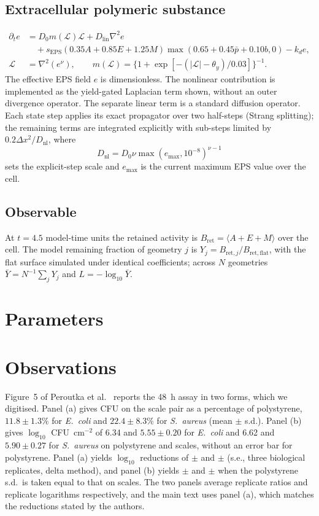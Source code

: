 \documentclass[11pt]{article}
\newcommand{\Ec}{\textit{E.~coli}}
\newcommand{\Sa}{\textit{S.~aureus}}
\begin{document}
\subsection{Extracellular polymeric substance}
\begin{align}
\partial_t e &= D_0m(\mathcal L)\mathcal L+D_{\mathrm{lin}}\nabla^2e\\
&\quad+s_{\mathrm{EPS}}(0.35A+0.85E+1.25M)\max(0.65+0.45\bar p+0.10b,0)-k_de,\\
\mathcal L &= \nabla^2(e^\nu),\qquad m(\mathcal L)=\{1+\exp[-(|\mathcal L|-\theta_y)/0.03]\}^{-1}.
\end{align}
The effective EPS field $e$ is dimensionless. The nonlinear contribution is implemented as the yield-gated Laplacian term shown, without an outer divergence operator. The separate linear term is a standard diffusion operator. Each state step applies its exact propagator over two half-steps (Strang splitting); the remaining terms are integrated explicitly with sub-steps limited by $0.2\Delta x^2/D_{\mathrm{nl}}$, where
\begin{equation}
D_{\mathrm{nl}}=D_0\nu\max(e_{\max},10^{-8})^{\nu-1}
\end{equation}
sets the explicit-step scale and $e_{\max}$ is the current maximum EPS value over the cell.

\subsection{Observable}
At $t=4.5$ model-time units the retained activity is $B_{\mathrm{ret}}=\langle A+E+M\rangle$ over the cell. The model remaining fraction of geometry $j$ is $Y_j=B_{\mathrm{ret},j}/B_{\mathrm{ret,flat}}$, with the flat surface simulated under identical coefficients; across $N$ geometries $\bar Y=N^{-1}\sum_jY_j$ and $L=-\log_{10}\bar Y$.

\section{Parameters}



\section{Observations}
Figure~5 of Peroutka et al.\ \cite{Peroutka2026} reports the 48~h assay in two forms, which we digitised. Panel (a) gives CFU on the scale pair as a percentage of polystyrene, $11.8\pm1.3\%$ for \Ec{} and $22.4\pm8.3\%$ for \Sa{} (mean $\pm$ s.d.). Panel (b) gives $\log_{10}$ CFU~cm$^{-2}$ of 6.34 and $5.55\pm0.20$ for \Ec{} and 6.62 and $5.90\pm0.27$ for \Sa{} on polystyrene and scales, without an error bar for polystyrene. Panel (a) yields $\log_{10}$ reductions of \LRobsEc{} $\pm$ \SEobsEc{} and \LRobsSa{} $\pm$ \SEobsSa{} (s.e., three biological replicates, delta method), and panel (b) yields \LRobsBEc{} $\pm$ \SEobsBEc{} and \LRobsBSa{} $\pm$ \SEobsBSa{} when the polystyrene s.d.\ is taken equal to that on scales. The two panels average replicate ratios and replicate logarithms respectively, and the main text uses panel (a), which matches the reductions stated by the authors.
\end{document}
